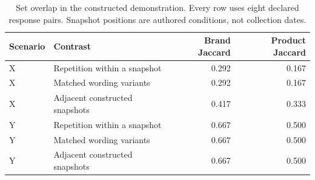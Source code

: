 \begin{table}[H]
\begin{revision}
\caption{Set overlap in the constructed demonstration. Every row uses eight declared response pairs. Snapshot positions are authored conditions, not collection dates.}\label{tab:demo_overlap}
\small
\begin{tabularx}{\textwidth}{lXrr}
\toprule
Scenario & Contrast & Brand Jaccard & Product Jaccard \\
\midrule
X & Repetition within a snapshot & 0.292 & 0.167 \\
X & Matched wording variants & 0.292 & 0.167 \\
X & Adjacent constructed snapshots & 0.417 & 0.333 \\
Y & Repetition within a snapshot & 0.667 & 0.500 \\
Y & Matched wording variants & 0.667 & 0.500 \\
Y & Adjacent constructed snapshots & 0.667 & 0.500 \\
\bottomrule
\end{tabularx}
\end{revision}
\end{table}
